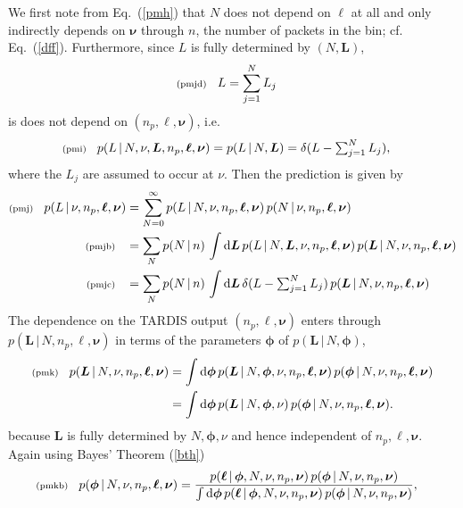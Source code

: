 \documentclass[11pt]{article}
\newcommand{\lleq}[1]{\label{#1} }
\renewcommand{\lleq}[1]{\label{#1} {\scriptstyle {\rm (#1)}} \hspace*{2ex} }
\newcommand{\cond}{\,|\,}
\newcommand{\bml}{{\bm{\ell}}}
\newcommand{\bmL}{{\bm{L}}}
\newcommand{\bmphi}{{\bm{\phi}}}
\newcommand{\bmnu}{{\bm{\nu}}}
\newcommand{\refeq}[1]{Eq.~(\ref{#1})}
\newcommand{\npack}{n_p}
\newcommand{\rmdx}[1]{\mbox{d} #1 \,} %
\begin{document}
We first note from \refeq{pmh} that $N$ does not depend on $\bml$ at
all and only indirectly depends on $\bmnu$ through $n$, the number of
packets in the bin; cf. \refeq{dff}. Furthermore, since $L$ is fully
determined by $(N,\bmL)$,
\begin{align}
  \lleq{pmjd}
  L &= \sum_{j=1}^N L_j
\end{align}
is does not depend on $(\npack,\bml,\bmnu)$, i.e.\
\begin{align}
  \lleq{pmi}
  p(L\cond N,\nu,\bmL,\npack,\bml, \bmnu)
  = p(L\cond N, \bmL)
  &= \delta(L - \textstyle\sum_{j=1}^N L_j),
\end{align}
where the $L_j$ are assumed to occur at $\nu$.
Then the prediction is given by
\begin{align}
  \lleq{pmj}
  p(L\cond \nu, \npack,\bml, \bmnu)
  &= \sum_{N=0}^\infty p(L\cond N,\nu, \npack,\bml, \bmnu)\,p(N\cond \nu, \npack,\bml, \bmnu) \\
  \lleq{pmjb}
  &= \sum_N p(N\cond n)\,\int \rmdx{\bmL} p(L\cond N,\bmL,\nu, \npack,\bml, \bmnu)\, p(\bmL\cond N,\nu, \npack,\bml, \bmnu)
  \\
  \lleq{pmjc}
  &= \sum_N p(N\cond n)\,\int \rmdx{\bmL} \delta(L - \textstyle\sum_{j=1}^N L_j)
  \, p(\bmL\cond N,\nu, \npack,\bml, \bmnu)
\end{align}
The dependence on the TARDIS output $(\npack,\bml, \bmnu)$ enters
through $p(\bmL\cond N,\npack,\bml, \bmnu)$ in terms of the parameters
$\bmphi$ of $p(\bmL\cond N,\bmphi)$,
\begin{align}
  \lleq{pmk}
  p(\bmL\cond N,\nu, \npack,\bml, \bmnu)
  &= \int \rmdx{\bmphi} p(\bmL\cond N,\bmphi,\nu, \npack,\bml, \bmnu)\,p(\bmphi\cond N,\nu, \npack,\bml, \bmnu) \\
  &= \int \rmdx{\bmphi} p(\bmL\cond N,\bmphi, \nu)\,p(\bmphi\cond N,\nu, \npack,\bml, \bmnu).
\end{align}
because $\bmL$ is fully determined by $N,\bmphi, \nu$ and hence independent
of $\npack,\bml, \bmnu$.
%
Again using Bayes' Theorem (\ref{bth})
\begin{align}
  \lleq{pmkb}
  p(\bmphi\cond N,\nu, \npack,\bml, \bmnu) &=
  \frac{p(\bml\cond \bmphi, N,\nu, \npack,\bmnu)\,p(\bmphi\cond N,\nu, \npack,\bmnu)} %
  {\int \rmdx{\bmphi} p(\bml\cond \bmphi,N,\nu, \npack,\bmnu)\,p(\bmphi\cond N,\nu, \npack,\bmnu)}, %
\end{align}
\end{document}

